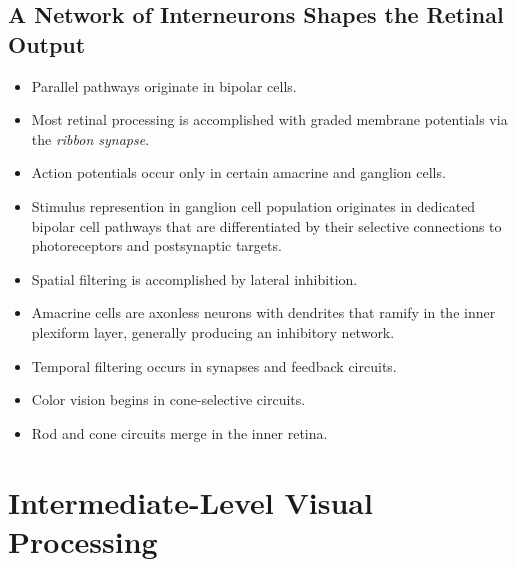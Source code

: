 \documentclass[12pt,a4paper]{article}
\begin{document}
\subsection{A Network of Interneurons Shapes the Retinal Output}
\begin{itemize}
    \item Parallel pathways originate in bipolar cells.
    \item Most retinal processing is accomplished with graded membrane potentials via the \textit{ribbon synapse}.
    \item Action potentials occur only in certain amacrine and ganglion cells.
    \item Stimulus represention in ganglion cell population originates in dedicated bipolar cell pathways that are differentiated by their selective connections to photoreceptors and postsynaptic targets.
    \item Spatial filtering is accomplished by lateral inhibition.
    \item Amacrine cells are axonless neurons with dendrites that ramify in the inner plexiform layer, generally producing an inhibitory network.
    \item Temporal filtering occurs in synapses and feedback circuits.
    \item Color vision begins in cone-selective circuits.
    \item Rod and cone circuits merge in the inner retina.
\end{itemize}

\clearpage
\section{Intermediate-Level Visual Processing}
\end{document}
